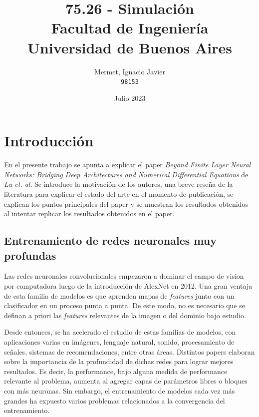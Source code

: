 \documentclass[titlepage,a4paper,oneside]{article}
\begin{document}
\begin{titlepage}
\title{
	75.26 \-- Simulación \\
    \large Facultad de Ingeniería\\
	Universidad de Buenos Aires
}
\author{
	Mermet, Ignacio Javier\\
	\texttt{98153}
}
\date{Julio 2023}

\maketitle

\end{titlepage}

\tableofcontents

\newpage

\section{Introducción}
En el presente trabajo se apunta a explicar el paper \textit{Beyond Finite Layer Neural Networks: Bridging Deep Architectures and Numerical Differential Equations}\cite{lu18d} de \textit{Lu et. al}.  Se introduce la motivación de los autores, una breve reseña de la literatura para explicar el estado del arte en el momento de publicación, se explican los puntos principales del paper y se muestran los resultados obtenidos al intentar replicar los resultados obtenidos en el paper.

\subsection{Entrenamiento de redes neuronales muy profundas}
Las redes neuronales convolucionales empezaron a dominar el campo de vision por computadora luego de la introducción de AlexNet \cite{DBLP:journals/corr/Krizhevsky14} en 2012. Una gran ventaja de esta familia de modelos es que aprenden mapas de \textit{features} junto con un clasificador en un proceso punta a punta. De este modo, no es necesario que se definan a priori las \textit{features} relevantes de la imagen o del dominio bajo estudio.

Desde entonces, se ha acelerado el estudio de estas familias de modelos, con aplicaciones varias en imágenes, lenguaje natural, sonido, procesamiento de señales, sistemas de recomendaciones, entre otras áreas. Distintos papers elaboran sobre la importancia de la profundidad de dichas redes para lograr mejores resultados. Es decir, la performance, bajo alguna medida de performance relevante al problema, aumenta al agregar capas de parámetros libres o bloques con más neuronas. Sin embargo, el entrenamiento de modelos cada vez más grandes ha expuesto varios problemas relacionados a la convergencia del entrenamiento.
\end{document}
